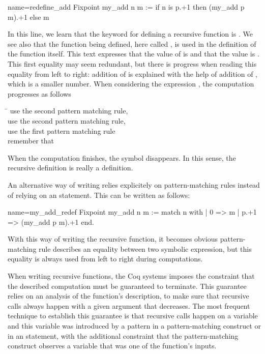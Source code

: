 \begin{coq}{name=redefine_add}{}
Fixpoint my_add n m :=
  if n is p.+1 then (my_add p m).+1 else m
\end{coq}
In this line, we learn that the keyword for defining a recursive
function is .  We see also that the function being
defined, here called , is used in the definition of the
function  itself.  This text expresses that the value of
 is
 and that the value  is .
This first equality may
seem redundant, but there is progress when reading this equality from
left to right: addition of  is explained with the help of
addition of , which is a smaller number.  When considering the
expression , the computation progresses as follows
\begin{tabbing}
\=\kill
{} \> use the second pattern matching rule, \\
 \> use the second pattern matching rule, \\
 \> use the first pattern matching rule\\
\> remember that \\
\end{tabbing}
When the computation finishes, the symbol  disappears.  In
this sense, the recursive definition is really a definition.

An alternative way of writing  relies explicitely on
pattern-matching rules instead of relying on an  statement.
This can be written as follows:

\begin{coq}{name=my_add_redef}{}
Fixpoint my_add n m :=
  match n with
  | 0 => m
  | p.+1 => (my_add p m).+1
  end.
\end{coq}
With this way of writing the recursive function, it becomes obvious
pattern-matching rule describes an equality between two symbolic
expression, but this equality is always used from left to right during
computations.

When writing recursive functions, the Coq systems imposes the
constraint that the described computation must be guaranteed to
terminate.  This guarantee relies on an analysis of the function's
description, to make sure that recursive calls always happen with a
given argument that decreases.  The most frequent technique to
establish this guarantee is that recursive calls happen on a variable
and this variable was introduced by a pattern in a pattern-matching
construct or in an  statement, with the additional constraint
that the pattern-matching construct observes a variable that was one
of the function's inputs.

